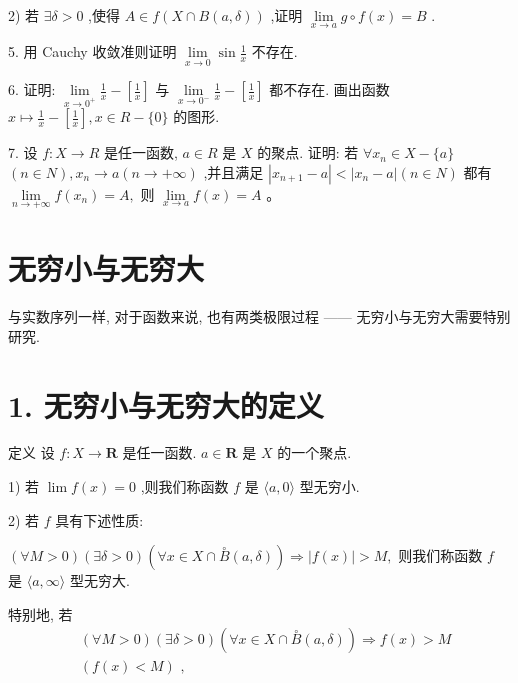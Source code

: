 2) 若 $\exists \delta  > 0$ ,使得 $A \in  f\left( {X \cap  B\left( {a,\delta }\right) }\right)$ ,证明 $\mathop{\lim }\limits_{{x \rightarrow  a}}g \circ  f\left( x\right)  = B$ .

5. 用 Cauchy 收敛准则证明 $\mathop{\lim }\limits_{{x \rightarrow  0}}\sin \frac{1}{x}$ 不存在.

6. 证明: $\mathop{\lim }\limits_{{x \rightarrow  {0}^{ + }}}\frac{1}{x} - \left\lbrack  \frac{1}{x}\right\rbrack$ 与 $\mathop{\lim }\limits_{{x \rightarrow  {0}^{ - }}}\frac{1}{x} - \left\lbrack  \frac{1}{x}\right\rbrack$ 都不存在. 画出函数 $x \mapsto  \frac{1}{x} - \left\lbrack  \frac{1}{x}\right\rbrack  ,x \in  R - \{ 0\}$ 的图形.

7. 设 $f : X \rightarrow  R$ 是任一函数, $a \in  R$ 是 $X$ 的聚点. 证明: 若 $\forall {x}_{n} \in  X - \{ a\}$  $\left( {n \in  N}\right) ,{x}_{n} \rightarrow  a\left( {n \rightarrow   + \infty }\right)$ ,并且满足 $\left| {{x}_{n + 1} - a}\right|  < \left| {{x}_{n} - a}\right| \left( {n \in  N}\right)$ 都有 $\mathop{\lim }\limits_{{n \rightarrow   + \infty }}f\left( {x}_{n}\right)  = A,$ 则 $\mathop{\lim }\limits_{{x \rightarrow  a}}f\left( x\right)  = A$ 。

\section{无穷小与无穷大}

与实数序列一样, 对于函数来说, 也有两类极限过程 —— 无穷小与无穷大需要特别研究.

\section*{1. 无穷小与无穷大的定义}

定义 设 $f : X \rightarrow  \mathbf{R}$ 是任一函数. $a \in  \mathbf{R}$ 是 $X$ 的一个聚点.

1) 若 $\lim f\left( x\right)  = 0$ ,则我们称函数 $f$ 是 $\langle a,0\rangle$ 型无穷小.

2) 若 $f$ 具有下述性质:

$\left( {\forall M > 0}\right) \left( {\exists \delta  > 0}\right) \left( {\forall x \in  X \cap  \overset{ \circ  }{B}\left( {a,\delta }\right) }\right)  \Rightarrow  \left| {f\left( x\right) }\right|  > M,$ 则我们称函数 $f$ 是 $\langle a,\infty \rangle$ 型无穷大.

特别地, 若
\begin{align*}
	&\left( {\forall M > 0}\right) \left( {\exists \delta  > 0}\right) \left( {\forall x \in  X \cap  \overset{ \circ  }{B}\left( {a,\delta }\right) }\right)  \Rightarrow  f\left( x\right)  > M\\
	&\left( {f\left( x\right)  < M}\right) \text{ , }
\end{align*}

